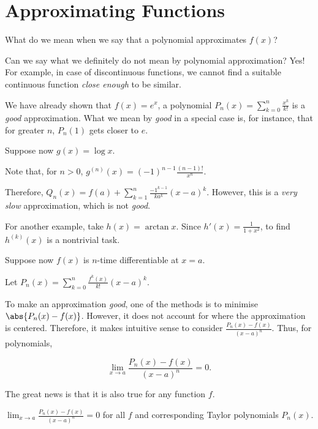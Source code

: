 \documentclass[11pt]{scrartcl}
\begin{document}
\section{Approximating Functions}

What do we mean when we say that a polynomial approximates $f(x)$?

Can we say what we definitely do not mean by polynomial approximation?
Yes! For example, in case of discontinuous functions, we cannot find a
suitable continuous function \textit{close enough} to be similar.

We have already shown that $f(x) = e^x$, a polynomial
$P_n(x) = \sum_{k=0}^n \frac{x^k}{k!}$ is a \textit{good}
approximation. What we mean by \textit{good} in a special case is, for
instance, that for greater $n$, $P_n(1)$ gets closer to $e$.

Suppose now $g(x) = \log x$.

Note that, for $n>0$, $g^{(n)}(x) = (-1)^{n-1}\frac{(n-1)!}{x^{n}}$.

Therefore, $Q_n(x) = f(a) + \sum_{k=1}^n \frac{-1^{k-1}}{k a^{k}}
(x-a)^k$. However, this is a \textit{very slow} approximation, which
is not \textit{good}.

For another example, take $h(x) = \arctan x$. Since
$h'(x) = \frac{1}{1+x^2}$, to find $h^{(k)}(x)$ is a nontrivial task.

Suppose now $f(x)$ is $n$-time differentiable at $x=a$.

Let $P_n(x) = \sum_{k=0}^n \frac{f^k(x)}{k!}(x-a)^k$.

To make an approximation \textit{good}, one of the methods is to
minimise $\abs{P_n(x) - f(x)}$. However, it does not account for where
the approximation is centered. Therefore, it makes intuitive sense to consider
$\frac{P_n(x) - f(x)}{(x-a)^n}$. Thus, for polynomials,

\begin{equation*}
\lim_{x\to a}\frac{P_n(x) - f(x)}{(x-a)^n} = 0.
\end{equation*}

The great news is that it is also true for any function $f$.

\begin{theorem}
$\lim_{x\to a}\frac{P_n(x) - f(x)}{(x-a)^n} = 0$ for all $f$ and corresponding Taylor polynomials $P_n(x)$.
\end{theorem}
\end{document}
